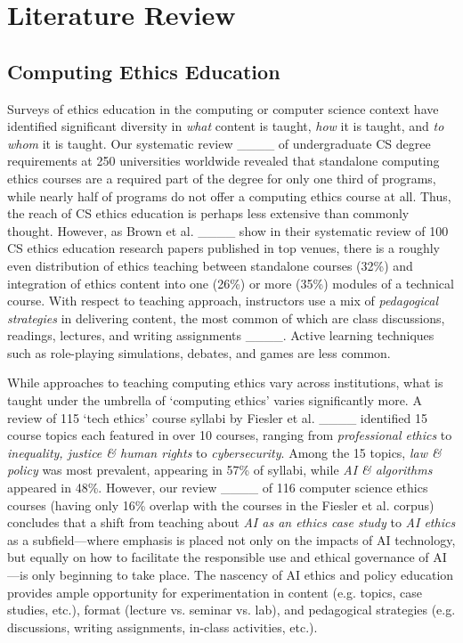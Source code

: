 \section{Literature Review}
\subsection*{Computing Ethics Education}

Surveys of ethics education in the computing or computer science context have identified significant diversity in \textit{what} content is taught, \textit{how} it is taught, and \textit{to whom} it is taught. Our systematic review ____ of undergraduate CS degree requirements at 250 universities worldwide revealed that standalone computing ethics courses are a required part of the degree for only one third of programs, while nearly half of programs do not offer a computing ethics course at all. Thus, the reach of CS ethics education is perhaps less extensive than commonly thought. However, as Brown et al. ____ show in their systematic review of 100 CS ethics education research papers published in top venues, there is a roughly even distribution of ethics teaching between standalone courses (32\%) and integration of ethics content into one (26\%) or more (35\%) modules of a technical course. With respect to teaching approach, instructors use a mix of \textit{pedagogical strategies} in delivering content, the most common of which are class discussions, readings, lectures, and writing assignments ____. Active learning techniques such as role-playing simulations, debates, and games are less common.

While approaches to teaching computing ethics vary across institutions, what is taught under the umbrella of `computing ethics' varies significantly more. A review of 115 `tech ethics' course syllabi by Fiesler et al. ____ identified 15 course topics each featured in over 10 courses, ranging from \textit{professional ethics} to \textit{inequality, justice \& human rights} to \textit{cybersecurity}. Among the 15 topics, \textit{law \& policy} was most prevalent, appearing in 57\% of syllabi, while \textit{AI \& algorithms} appeared in 48\%. However, our review ____ of 116 computer science ethics courses (having only 16\% overlap with the courses in the Fiesler et al. corpus) concludes that a shift from teaching about \textit{AI as an ethics case study} to \textit{AI ethics} as a subfield—where emphasis is placed not only on the impacts of AI technology, but equally on how to facilitate the responsible use and ethical governance of AI—is only beginning to take place. The nascency of AI ethics and policy education provides ample opportunity for experimentation in content (e.g. topics, case studies, etc.), format (lecture vs. seminar vs. lab), and pedagogical strategies (e.g. discussions, writing assignments, in-class activities, etc.).

